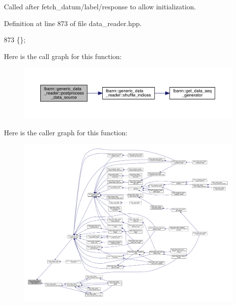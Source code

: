 Called after fetch\+\_\+datum/label/response to allow initialization. 

Definition at line 873 of file data\+\_\+reader.\+hpp.


\begin{DoxyCode}
873 \{\};
\end{DoxyCode}
Here is the call graph for this function\+:\nopagebreak
\begin{figure}[H]
\begin{center}
\leavevmode
\includegraphics[width=350pt]{classlbann_1_1generic__data__reader_a7bbf74725a96235dc1cd20ff440a69bd_cgraph}
\end{center}
\end{figure}
Here is the caller graph for this function\+:\nopagebreak
\begin{figure}[H]
\begin{center}
\leavevmode
\includegraphics[width=350pt]{classlbann_1_1generic__data__reader_a7bbf74725a96235dc1cd20ff440a69bd_icgraph}
\end{center}
\end{figure}
\mbox{\label{classlbann_1_1generic__data__reader_ad613f95666b973d8da77773fb34c9b66}} 
